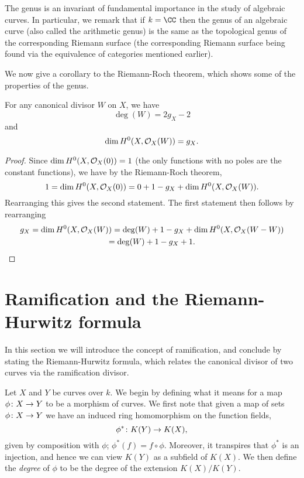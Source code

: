 The genus is an invariant of fundamental importance in the study of algebraic curves.
In particular, we remark that if $k = \CC$ then the genus of an algebraic curve (also called the arithmetic genus) is the same as the topological genus of the corresponding Riemann surface (the corresponding Riemann surface being found via the equivalence of categories mentioned earlier).

We now give a corollary to the Riemann-Roch theorem, which shows some of the properties of the genus.

    \begin{cor}\label{dim=gc}
    For any canonical divisor $W$ on $X$, we have 
        \[
        \deg(W) = 2g_X-2
        \]
    and 
        \[
        \dim H^0(X,{\cal O}_X(W)) = g_X.
        \]
    \end{cor}
    \begin{proof}
    Since $\dim H^0(X,{\cal O}_X(0)) = 1$ (the only functions with no poles are the constant functions), we have by the Riemann-Roch theorem, 
        \[
        1= \dim H^0(X,{\cal O}_X(0)) = 0 + 1 -g_X + \dim H^0(X,{\cal O}_X(W)).
        \]
    Rearranging this gives the second statement.
    The first statement then follows by rearranging
        \begin{multline*}
        g_X = \dim H^0(X,{\cal O}_X(W)) = \deg(W) + 1 -g_X +  \dim H^0(X,{\cal O}_X(W-W))\\ = \deg(W) + 1 -g_X + 1.
        \end{multline*}
    \end{proof}

\section{Ramification and the Riemann-Hurwitz formula}

In this section we will introduce the concept of ramification, and conclude by stating the Riemann-Hurwitz formula, which relates the canonical divisor of two curves via the ramification divisor.



Let $X$ and $Y$ be curves over $k$.
We begin by defining what it means for a map $\phi \colon X \rightarrow Y$ to be a morphism of curves.
We first note that given a map of sets $\phi \colon X \rightarrow Y$ we have an induced ring homomorphism on the function fields,
    \[
    \phi^* \colon K(Y) \rightarrow K(X),
    \]
given by composition with $\phi$; \ie $\phi^*(f) = f \circ \phi$.
Moreover, it transpires that $\phi^*$ is an injection, and hence we can view $K(Y)$ as a subfield of $K(X)$.
We then define the \emph{degree} of $\phi$ to be the degree of the extension $K(X)/K(Y)$.

